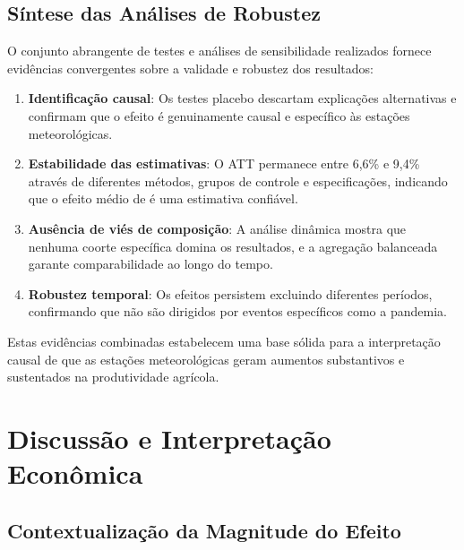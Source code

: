 \documentclass[
	12pt,				%
	oneside,			%
	a4paper,			%
	english,			%
	french,				%
	spanish,			%
	brazil				%
	]{abntex2}
\begin{document}
\subsection{Síntese das Análises de Robustez}

O conjunto abrangente de testes e análises de sensibilidade realizados fornece evidências convergentes sobre a validade e robustez dos resultados:

\begin{enumerate}
\item \textbf{Identificação causal}: Os testes placebo descartam explicações alternativas e confirmam que o efeito é genuinamente causal e específico às estações meteorológicas.

\item \textbf{Estabilidade das estimativas}: O ATT permanece entre 6,6\% e 9,4\% através de diferentes métodos, grupos de controle e especificações, indicando que o efeito médio de \mainattpct{} é uma estimativa confiável.

\item \textbf{Ausência de viés de composição}: A análise dinâmica mostra que nenhuma coorte específica domina os resultados, e a agregação balanceada garante comparabilidade ao longo do tempo.

\item \textbf{Robustez temporal}: Os efeitos persistem excluindo diferentes períodos, confirmando que não são dirigidos por eventos específicos como a pandemia.
\end{enumerate}

Estas evidências combinadas estabelecem uma base sólida para a interpretação causal de que as estações meteorológicas geram aumentos substantivos e sustentados na produtividade agrícola.

\section{Discussão e Interpretação Econômica}

\subsection{Contextualização da Magnitude do Efeito}
\end{document}
